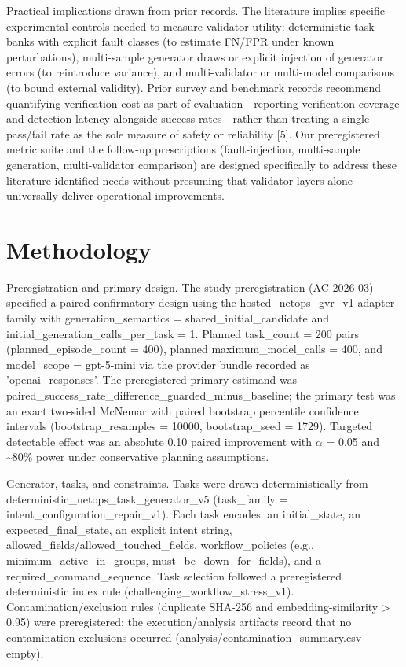 \documentclass[conference]{IEEEtran}
\begin{document}
Practical implications drawn from prior records. The literature implies specific experimental controls needed to measure validator utility: deterministic task banks with explicit fault classes (to estimate FN/FPR under known perturbations), multi-sample generator draws or explicit injection of generator errors (to reintroduce variance), and multi-validator or multi-model comparisons (to bound external validity). Prior survey and benchmark records recommend quantifying verification cost as part of evaluation---reporting verification coverage and detection latency alongside success rates---rather than treating a single pass/fail rate as the sole measure of safety or reliability [5]. Our preregistered metric suite and the follow-up prescriptions (fault-injection, multi-sample generation, multi-validator comparison) are designed specifically to address these literature-identified needs without presuming that validator layers alone universally deliver operational improvements.

\section{Methodology}
Preregistration and primary design. The study preregistration (AC-2026-03) specified a paired confirmatory design using the hosted\_netops\_gvr\_v1 adapter family with generation\_semantics = shared\_initial\_candidate and initial\_generation\_calls\_per\_task = 1. Planned task\_count = 200 pairs (planned\_episode\_count = 400), planned maximum\_model\_calls = 400, and model\_scope = gpt-5-mini via the provider bundle recorded as 'openai\_responses'. The preregistered primary estimand was paired\_success\_rate\_difference\_guarded\_minus\_baseline; the primary test was an exact two-sided McNemar with paired bootstrap percentile confidence intervals (bootstrap\_resamples = 10000, bootstrap\_seed = 1729). Targeted detectable effect was an absolute 0.10 paired improvement with \ensuremath{\alpha} = 0.05 and \textasciitilde{}80\% power under conservative planning assumptions.

Generator, tasks, and constraints. Tasks were drawn deterministically from deterministic\_netops\_task\_generator\_v5 (task\_family = intent\_configuration\_repair\_v1). Each task encodes: an initial\_state, an expected\_final\_state, an explicit intent string, allowed\_fields/allowed\_touched\_fields, workflow\_policies (e.g., minimum\_active\_in\_groups, must\_be\_down\_for\_fields), and a required\_command\_sequence. Task selection followed a preregistered deterministic index rule (challenging\_workflow\_stress\_v1). Contamination/exclusion rules (duplicate SHA-256 and embedding-similarity > 0.95) were preregistered; the execution/analysis artifacts record that no contamination exclusions occurred (analysis/contamination\_summary.csv empty).
\end{document}
